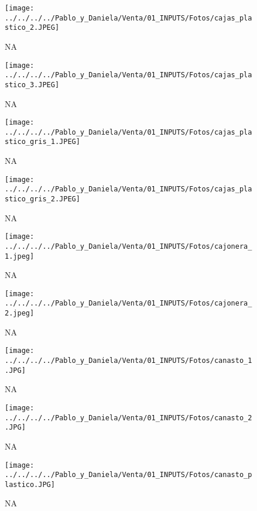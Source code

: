 \documentclass[
]{article}
\begin{document}
\pagebreak

\begin{figure}
\centering
\texttt{[image: ../../../../Pablo\_y\_Daniela/Venta/01\_INPUTS/Fotos/cajas\_plastico\_2.JPEG]}
\caption{NA}
\end{figure}

\pagebreak

\begin{figure}
\centering
\texttt{[image: ../../../../Pablo\_y\_Daniela/Venta/01\_INPUTS/Fotos/cajas\_plastico\_3.JPEG]}
\caption{NA}
\end{figure}

\pagebreak

\begin{figure}
\centering
\texttt{[image: ../../../../Pablo\_y\_Daniela/Venta/01\_INPUTS/Fotos/cajas\_plastico\_gris\_1.JPEG]}
\caption{NA}
\end{figure}

\pagebreak

\begin{figure}
\centering
\texttt{[image: ../../../../Pablo\_y\_Daniela/Venta/01\_INPUTS/Fotos/cajas\_plastico\_gris\_2.JPEG]}
\caption{NA}
\end{figure}

\pagebreak

\begin{figure}
\centering
\texttt{[image: ../../../../Pablo\_y\_Daniela/Venta/01\_INPUTS/Fotos/cajonera\_1.jpeg]}
\caption{NA}
\end{figure}

\pagebreak

\begin{figure}
\centering
\texttt{[image: ../../../../Pablo\_y\_Daniela/Venta/01\_INPUTS/Fotos/cajonera\_2.jpeg]}
\caption{NA}
\end{figure}

\pagebreak

\begin{figure}
\centering
\texttt{[image: ../../../../Pablo\_y\_Daniela/Venta/01\_INPUTS/Fotos/canasto\_1.JPG]}
\caption{NA}
\end{figure}

\pagebreak

\begin{figure}
\centering
\texttt{[image: ../../../../Pablo\_y\_Daniela/Venta/01\_INPUTS/Fotos/canasto\_2.JPG]}
\caption{NA}
\end{figure}

\pagebreak

\begin{figure}
\centering
\texttt{[image: ../../../../Pablo\_y\_Daniela/Venta/01\_INPUTS/Fotos/canasto\_plastico.JPG]}
\caption{NA}
\end{figure}
\end{document}
